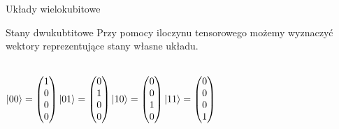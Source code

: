 \documentclass{beamer}
\DeclarePairedDelimiter\ket{\lvert}{\rangle}
\begin{document}
	\begin{frame}{Układy wielokubitowe}
				\begin{block}{Stany dwukubtitowe}
			\vspace{0.5em}
			Przy pomocy iloczynu tensorowego możemy wyznaczyć  wektory reprezentujące stany własne układu.\\~\\
			\begin{center}
			$
			\ket{00} =
			\begin{pmatrix}
			1\\
			0\\
			0\\
			0
			\end{pmatrix}
			\ket{01} =
			\begin{pmatrix}
			0\\
			1\\
			0\\
			0
			\end{pmatrix}
			\ket{10} =
			\begin{pmatrix}
			0\\
			0\\
			1\\
			0
			\end{pmatrix}
			\ket{11} =
			\begin{pmatrix}
			0\\
			0\\
			0\\
			1
			\end{pmatrix}
			$
			\end{center}
			\vspace{0.5em}
		\end{block}
	\end{frame}
	
\end{document}
